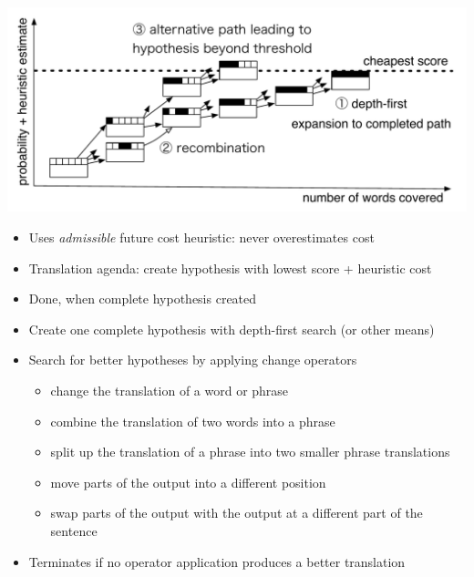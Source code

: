 \documentclass[landscape]{slides}
\begin{document}
\begin{center}
\includegraphics[scale=1]{a-star-search.pdf}
\end{center}
\begin{itemize}\vspace{-5mm}
\item Uses {\em admissible} future cost heuristic: never overestimates cost \vspace{-5mm}
\item Translation agenda: create hypothesis with lowest score + heuristic cost \vspace{-5mm}
\item Done, when complete hypothesis created
\end{itemize}



\begin{itemize} \vspace{10mm}
\item Create one complete hypothesis with depth-first search (or other means)
\item Search for better hypotheses by applying change operators
\begin{itemize}
\item change the translation of a word or phrase
\item combine the translation of two words into a phrase
\item split up the translation of a phrase into two smaller phrase translations
\item move parts of the output into a different position
\item swap parts of the output with the output at a different part of the sentence
\end{itemize}
\item Terminates if no operator application produces a better translation
\end{itemize}
\end{document}
